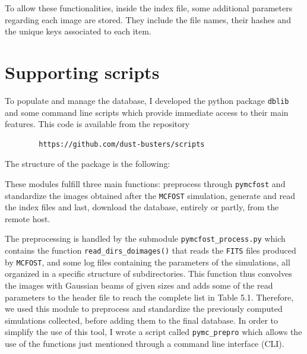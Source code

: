 \documentclass[a4paper,10pt]{report}
\begin{document}
To allow these functionalities, inside the index file, some additional parameters regarding each image are stored.
They include the file names, their hashes and the unique keys associated to each item.

\section{Supporting scripts}

To populate and manage the database, I developed the python package \lstinline{dblib}
and some command line scripts which provide immediate access to their main features.
This code is available from the repository
\begin{center}
    \begin{lstlisting}
        https://github.com/dust-busters/scripts
    \end{lstlisting}
\end{center}
The structure of the package is the following:

\begin{center}
\begin{minipage}{\textwidth}
\end{minipage}
\end{center} 
These modules fulfill three main functions: preprocess through \lstinline{pymcfost} and standardize
the images obtained after the \lstinline{MCFOST} simulation, generate and read
the index files and last, download the database, entirely or partly, from the remote host.

The preprocessing is handled by the submodule \lstinline{pymcfost_process.py} which contains the function 
\lstinline{read_dirs_doimages()} that reads the \lstinline{FITS} files produced by \lstinline{MCFOST},
and some log files containing the parameters of the simulations, all  organized in a specific structure of subdirectories.
This function thus convolves the images with Gaussian beams of given sizes and adds some of the read parameters to the header
file to reach the complete list in Table 5.1.
Therefore, we used this module to preprocess and standardize the previously computed
simulations collected, before adding them to the final database.
In order to simplify the use of this tool, I wrote a script called \lstinline{pymc_prepro} which
allows the use of the functions just mentioned through a command line interface (CLI).
\end{document}
